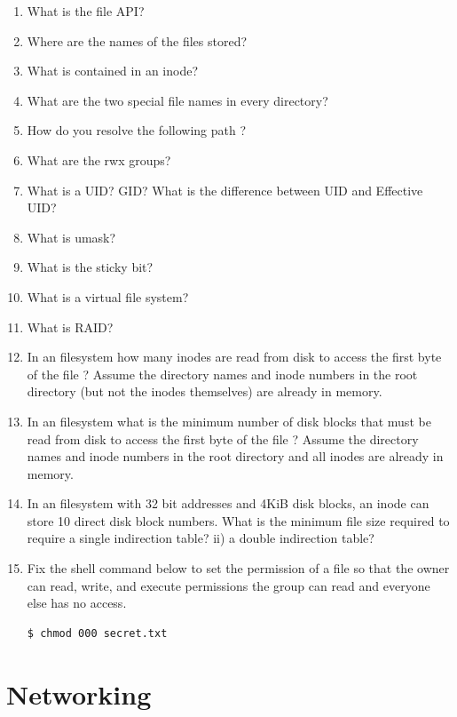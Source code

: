 \begin{enumerate}
\item What is the file API?
\item Where are the names of the files stored?
\item What is contained in an inode?
\item What are the two special file names in every directory?
\item How do you resolve the following path ?
\item What are the rwx groups?
\item What is a UID? GID? What is the difference between UID and Effective UID?
\item What is umask?
\item What is the sticky bit?
\item What is a virtual file system?
\item What is RAID?
\item In an  filesystem how many inodes are read from disk to access the first byte of the file  ? Assume the directory names and inode numbers in the root directory (but not the inodes themselves) are already in memory.

\item In an  filesystem what is the minimum number of disk blocks that must be read from disk to access the first byte of the file  ? Assume the directory names and inode numbers in the root directory and all inodes are already in memory.

\item In an  filesystem with 32 bit addresses and 4KiB disk blocks, an inode can store 10 direct disk block numbers. What is the minimum file size required to require a single indirection table? ii) a double indirection table?

\item Fix the shell command  below to set the permission of a file  so that the owner can read, write, and execute permissions the group can read and everyone else has no access.

\begin{lstlisting}[language=bash]
$ chmod 000 secret.txt
\end{lstlisting}

\end{enumerate}

\section{Networking}

